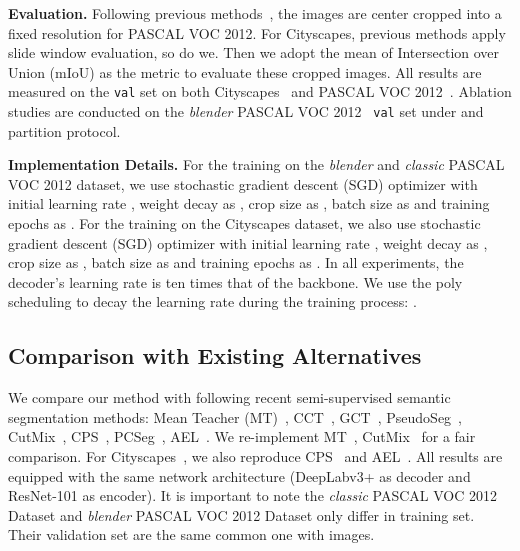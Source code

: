 \documentclass[10pt, twocolumn, letterpaper]{article}
\begin{document}
\noindent\textbf{Evaluation.} 
Following previous methods~\cite{ael, pc2seg, cct, french2019semi}, the images are center cropped into a fixed resolution for PASCAL VOC 2012.
For Cityscapes, previous methods apply slide window evaluation, so do we.
Then we adopt the mean of Intersection over Union (mIoU) as the metric to evaluate these cropped images.
All results are measured on the \texttt{val} set on both Cityscapes~\cite{cityscapes} and PASCAL VOC 2012~\cite{voc}.
Ablation studies are conducted on the \textit{blender} PASCAL VOC 2012~\cite{voc} \texttt{val} set under  and  partition protocol.



\noindent\textbf{Implementation Details.}
For the training on the \textit{blender} and \textit{classic} PASCAL VOC 2012 dataset, we use stochastic gradient descent (SGD) optimizer with initial learning rate ,  weight decay as , crop size as , batch size as  and training epochs as .
For the training on the Cityscapes dataset, we also use stochastic gradient descent (SGD) optimizer with initial learning rate ,  weight decay as , crop size as , batch size as  and training epochs as .
In all experiments, the decoder's learning rate is ten times that of the backbone.
We use the poly scheduling to decay the learning rate during the training process: .


\subsection{Comparison with Existing Alternatives}


We compare our method with following recent semi-supervised semantic segmentation methods: Mean Teacher (MT)~\cite{meanteacher}, CCT~\cite{cct},  GCT~\cite{gct}, PseudoSeg~\cite{pseudoseg}, CutMix~\cite{french2019semi}, CPS~\cite{cps}, PCSeg~\cite{pc2seg}, AEL~\cite{ael}. 
We re-implement MT~\cite{meanteacher}, CutMix~\cite{cutmix} for a fair comparison.
For Cityscapes~\cite{cityscapes}, we also reproduce CPS~\cite{cps} and AEL~\cite{ael}.
All results are equipped with the same network architecture (DeepLabv3+ as decoder and ResNet-101 as encoder).
It is important to note the \textit{classic} PASCAL VOC 2012 Dataset and \textit{blender} PASCAL VOC 2012 Dataset only differ in training set. 
Their validation set are the same common one with  images.
\end{document}
